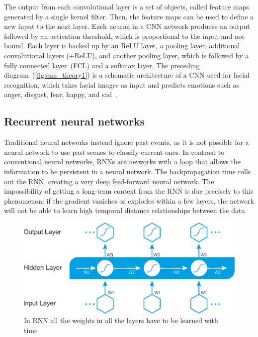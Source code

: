\hspace*{3.5mm} The output from each convolutional layer is a set of objects, called feature maps generated by a single kernel filter. Then, the feature maps can be used to define a new input to the next layer. Each neuron in a CNN network produces an output followed by an activation threshold, which is proportional to the input and not bound. Each layer is backed up by an ReLU layer, a pooling layer, additional convolutional layers (+ReLU), and another pooling layer, which is followed by a fully connected layer~(FCL) and a softmax layer. The preceding diagram~(\cref{fig:cnn_theory1}) is a schematic architecture of a CNN used for facial recognition, which takes facial images as input and predicts emotions such as anger, disgust, fear, happy, and sad~\cite{karimDLTF2018}.  

\subsection{Recurrent neural networks}
Traditional neural networks instead ignore past events, as it is not possible for a neural network to use past scenes to classify current ones. In contrast to conventional neural networks, RNNs are networks with a loop that allows the information to be persistent in a neural network. The backpropagation time rolls out the RNN, creating a very deep feed-forward neural network. The impossibility of getting a long-term context from the RNN is due precisely to this phenomenon: if the gradient vanishes or explodes within a few layers, the network will not be able to learn high temporal distance relationships between the data. 

\begin{figure}[h]
    \centering
    \includegraphics[scale=0.3]{images/B09698_06_4.png}
    \caption{In RNN all the weights in all the layers have to be learned with time~\cite{karimDLTF2018}}
    \label{fig:rnn_theory1}
    \vspace{-2mm}
\end{figure}

